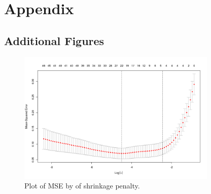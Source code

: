 \documentclass[a4paper, 10pt, titlepage]{article}
\begin{document}
\newpage

\section{Appendix}
\subsection{Additional Figures}

\begin{figure}[!ht]
	\centering
		\includegraphics[width = 0.85\textwidth]{images/shrinkage.png}
	\caption{Plot of MSE by of shrinkage penalty.}
\end{figure}

\clearpage
\end{document}
